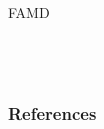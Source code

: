 \documentclass{beamer}
\begin{document}
\begin{frame}{FAMD}
\begin{columns}
\begin{figure}[h]
\begin{center}
\label{FAMD_Quantitative variables}
\end{center}
\end{figure}
\end{columns}
\end{frame}


\begin{frame}[t,allowframebreaks]
\frametitle{References}
\printbibliography
\end{frame}
\end{document}
